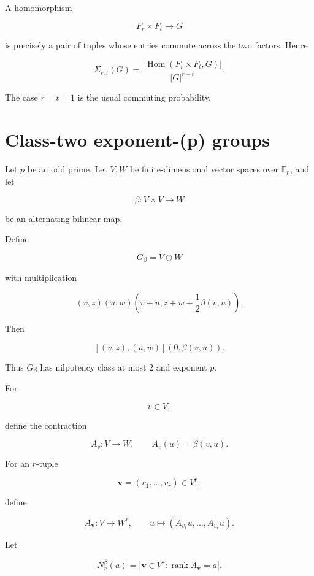 \documentclass[11pt]{article}
\begin{document}
A homomorphism

\[
F_r\times F_t\to G
\]

is precisely a pair of tuples whose entries commute across the two factors. Hence

\[
\Sigma_{r,t}(G)
=\frac{|\operatorname{Hom}(F_r\times F_t,G)|}{|G|^{r+t}}.
\]

The case $r=t=1$ is the usual commuting probability.

\section{Class-two exponent-(p) groups}

Let $p$ be an odd prime. Let $V,W$ be finite-dimensional vector spaces over $\mathbb F_p$, and let

\[
\beta:V\times V\to W
\]

be an alternating bilinear map.

Define

\[
G_\beta=V\oplus W
\]

with multiplication

\[
(v,z)(u,w)
\left(
v+u,
z+w+\frac12\beta(v,u)
\right).
\]

Then

\[
[(v,z),(u,w)]
(0,\beta(v,u)).
\]

Thus $G_\beta$ has nilpotency class at most $2$ and exponent $p$.

For

\[
v\in V,
\]

define the contraction

\[
A_v:V\to W,
\qquad
A_v(u)=\beta(v,u).
\]

For an $r$-tuple

\[
\mathbf v=(v_1,\dots,v_r)\in V^r,
\]

define

\[
A_{\mathbf v}:V\to W^r,
\qquad
u\mapsto
(A_{v_1}u,\dots,A_{v_r}u).
\]

Let

\[
N_r^\beta(a)=
|{\mathbf v\in V^r:\operatorname{rank}A_{\mathbf v}=a}|.
\]
\end{document}
